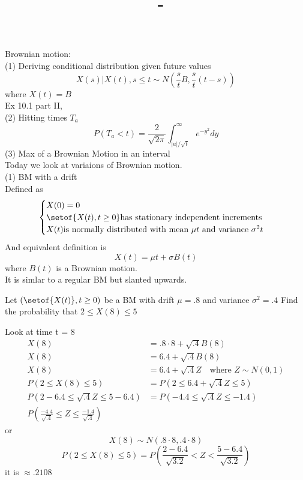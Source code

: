\documentclass[answers,12pt,addpoints]{exam}
\author{\name}
\title{\course \ - \assignment}
\begin{document}
\maketitle


\newpage

Brownian motion:\\
(1) Deriving conditional distribution given future values\\
$$X(s) | X(t) ,s \leq t \sim N(\frac{s}{t}B, \frac{s}{t} (t-s))$$
where $X(t) = B$\\
Ex 10.1 part II, \\
(2) Hitting times $T_a$ 
$$P(T_a < t) = \frac{2}{\sqrt{2\pi}} \int_{|a|/\sqrt{t}}^{\infty} e^{-y^2} dy$$
(3) Max of a Brownian Motion in an interval \\
Today we look at variaions of Brownian motion.\\
(1) BM with a drift \\
Defined as 
$$\begin{cases}
    X(0) = 0\\
    \setof{X(t), t\geq 0} \text{has stationary independent increments}\\
    X(t) \text{is normally distributed with mean } \mu t \text{ and variance } \sigma^2 t
\end{cases}$$
And equivalent definition is 
$$ X(t) = \mu t + \sigma B(t)$$
where $B(t)$ is a Brownian motion.\\
It is simlar to a regular BM but slanted upwards.\\
\begin{example}
    Let $(\setof{X(t)}, t \geq 0)$ be a BM with drift $\mu = .8$ and variance $\sigma^2 = .4$ Find the probability that $2 \leq X(8) \leq 5$\\
    \begin{solution}
        Look at time t = 8\\
        \begin{align*}
        X(8) &= .8 \cdot 8 + \sqrt{.4}B(8) \\
        X(8) &= 6.4 + \sqrt{.4}B(8) \\
        X(8) &= 6.4 + \sqrt{.4}Z \quad \text{where } Z \sim N(0,1) \\
        P(2 \leq X(8) \leq 5) &= P(2 \leq 6.4 + \sqrt{.4}Z \leq 5) \\
        P(2-6.4 \leq \sqrt{.4}Z \leq 5-6.4) &= P(-4.4 \leq \sqrt{.4}Z \leq -1.4) \\
        P\left(\frac{-4.4}{\sqrt{.4}} \leq Z \leq \frac{-1.4}{\sqrt{.4}}\right) & 
        \end{align*}
        or
        $$X(8) \sim N(.8 \cdot 8, .4 \cdot 8)$$
        $$P(2 \leq X(8) \leq 5) = P(\frac{2-6.4}{\sqrt{3.2}} < Z < \frac{5-6.4}{\sqrt{3.2}})$$
        it is $\approx .2108$
    \end{solution}
\end{example}
\end{document}

